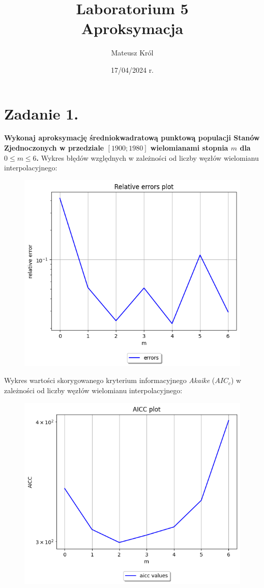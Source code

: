 \documentclass{article}
\title{%
Laboratorium 5\\
  \huge Aproksymacja}
\author{Mateusz Król}
\date{17/04/2024 r.}
\begin{document}
\maketitle


\section*{Zadanie 1.}
\textbf{Wykonaj aproksymację średniokwadratową punktową populacji
Stanów Zjednoczonych w przedziale $[1900;1980]$ wielomianami stopnia $m$ dla
$0 \leq m \leq 6$.}
\newpage
Wykres błędów względnych w zależności od liczby węzłów wielomianu 
interpolacyjnego:
\begin{figure}[H]
  \includegraphics[width=\linewidth]{figures/errors.png}
\end{figure}
\newpage
Wykres wartości skorygowanego kryterium informacyjnego \textit{Akaike} 
($AIC_c$) w zależności od liczby węzłów wielomianu 
interpolacyjnego:
\begin{figure}[H]
  \includegraphics[width=\linewidth]{figures/aicc.png}
\end{figure}
\end{document}
